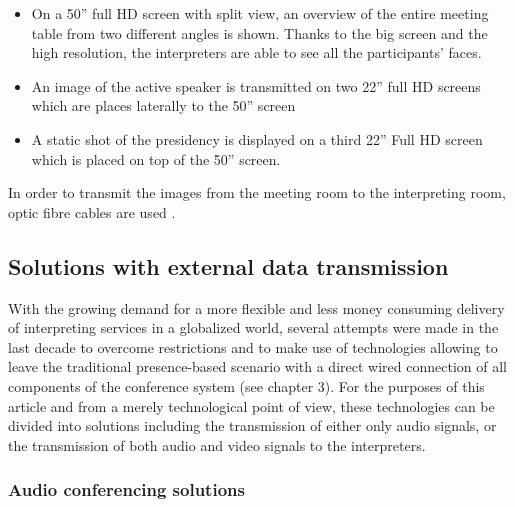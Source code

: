 \documentclass[output=paper]{langsci/langscibook}
\begin{document}
\begin{itemize}
\item On a 50” full \textsc{HD} screen with split view, an overview of the entire meeting table from two different angles is shown. Thanks to the big screen and the high resolution, the interpreters are able to see all the participants’ faces.
\item An image of the active speaker is transmitted on two 22” full \textsc{HD} screens which are places laterally to the 50” screen
\item A static shot of the presidency is displayed on a third 22” Full \textsc{HD} screen which is placed on top of the 50” screen.
\end{itemize}

In order to transmit the images from the meeting room to the interpreting room, optic fibre cables are used \citep{Technical2016}. 

\subsection{Solutions with external data transmission} 

With the growing demand for a more flexible and less money consuming delivery of interpreting services in a globalized world, several attempts were made in the last decade to overcome restrictions and to make use of technologies allowing to leave the traditional presence-based scenario with a direct wired connection of all components of the conference system (see chapter 3). For the purposes of this article and from a merely technological point of view, these technologies can be divided into solutions including the transmission of either only audio signals, or the transmission of both audio and video signals to the interpreters. 

\subsubsection{Audio conferencing solutions}
\end{document}
